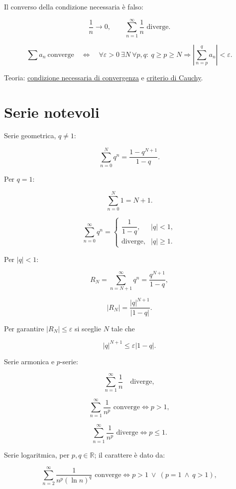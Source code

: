 Il converso della condizione necessaria è falso:

\[
\frac1n\to0,
\qquad
\sum_{n=1}^{\infty}\frac1n\text{ diverge}.
\]

\[
\displaystyle
\sum a_n\ \text{converge}
\quad\Longleftrightarrow\quad
\forall\varepsilon>0\ \exists N\ \forall p,q:
\ q\ge p\ge N
\Longrightarrow
\left\lvert\sum_{n=p}^{q}a_n\right\rvert<\varepsilon.
\]

Teoria: \href{https://ingegnerismo.it/matematica/condizione-necessaria-convergenza/}{condizione necessaria di convergenza} e \href{https://ingegnerismo.it/matematica/criterio-di-cauchy/}{criterio di Cauchy}.

\section{Serie notevoli}\label{serie-notevoli}

Serie geometrica, \(q\ne1\):

\[
\displaystyle
\sum_{n=0}^{N}q^n
=
\frac{1-q^{N+1}}{1-q}.
\]

Per \(q=1\):

\[
\displaystyle
\sum_{n=0}^{N}1=N+1.
\]

\[
\displaystyle
\sum_{n=0}^{\infty}q^n
=
\begin{cases}
\dfrac1{1-q}, & \lvert q\rvert<1,\\[4pt]
\text{diverge}, & \lvert q\rvert\ge1.
\end{cases}
\]

Per \(\lvert q\rvert<1\):

\[
\displaystyle
R_N=\sum_{n=N+1}^{\infty}q^n
=
\frac{q^{N+1}}{1-q},
\]

\[
|R_N|=\frac{|q|^{N+1}}{|1-q|}.
\]

Per garantire \(|R_N|\le\varepsilon\) si sceglie \(N\) tale che

\[
|q|^{N+1}\le\varepsilon|1-q|.
\]

Serie armonica e \(p\)-serie:

\[
\displaystyle
\sum_{n=1}^{\infty}\frac1n
\quad\text{diverge},
\]

\[
\displaystyle
\sum_{n=1}^{\infty}\frac1{n^p}\text{ converge}
\Longleftrightarrow p>1,
\]

\[
\displaystyle
\sum_{n=1}^{\infty}\frac1{n^p}\text{ diverge}
\Longleftrightarrow p\le1.
\]

Serie logaritmica, per \(p,q\in\mathbb R\); il carattere è dato da:

\[
\displaystyle
\sum_{n=2}^{\infty}\frac1{n^p(\ln n)^q}\text{ converge}
\Longleftrightarrow
p>1\ \lor\ (p=1\ \land\ q>1),
\]

